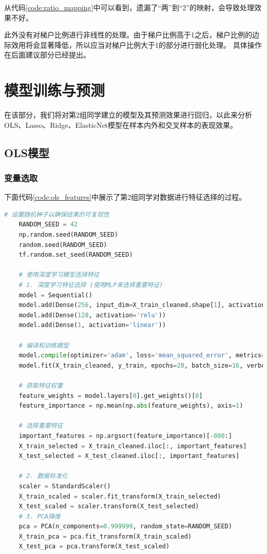 \documentclass[
    report,     %
    oneside,    %
    UTF8,       %
    zihao=-4    %
]{config} %
\begin{document}
从代码\ref{code:ratio_mapping}中可以看到，遗漏了“两”到“2”的映射，会导致处理效果不好。

此外没有对梯户比例进行非线性的处理。由于梯户比例高于1之后，梯户比例的边际效用将会显著降低，所以应当对梯户比例大于1的部分进行弱化处理。
具体操作在后面建议部分已经提出。

\chapter{模型训练与预测}
在该部分，我们将对第2组同学建立的模型及其预测效果进行回归，以此来分析
OLS、Lasso、Ridge、ElasticNet模型在样本内外和交叉样本的表现效果。

\section{OLS模型}

\subsection{变量选取}
下面代码\ref{code:ols_features}中展示了第2组同学对数据进行特征选择的过程。

\begin{lstlisting}[label=code:ols_features, language=Python, caption=OLS模型特征选取]
    # 设置随机种子以确保结果的可复现性
    RANDOM_SEED = 42
    np.random.seed(RANDOM_SEED)
    random.seed(RANDOM_SEED)
    tf.random.set_seed(RANDOM_SEED)

    # 使用深度学习模型选择特征
    # 1. 深度学习特征选择 (使用MLP来选择重要特征)
    model = Sequential()
    model.add(Dense(256, input_dim=X_train_cleaned.shape[1], activation='relu'))
    model.add(Dense(128, activation='relu'))
    model.add(Dense(1, activation='linear'))

    # 编译和训练模型
    model.compile(optimizer='adam', loss='mean_squared_error', metrics=['mean_absolute_error'])
    model.fit(X_train_cleaned, y_train, epochs=20, batch_size=16, verbose=1)

    # 获取特征权重
    feature_weights = model.layers[0].get_weights()[0]
    feature_importance = np.mean(np.abs(feature_weights), axis=1)

    # 选择重要特征
    important_features = np.argsort(feature_importance)[-800:]
    X_train_selected = X_train_cleaned.iloc[:, important_features]
    X_test_selected = X_test_cleaned.iloc[:, important_features]

    # 2. 数据标准化
    scaler = StandardScaler()
    X_train_scaled = scaler.fit_transform(X_train_selected)
    X_test_scaled = scaler.transform(X_test_selected)
    # 3. PCA降维
    pca = PCA(n_components=0.999999, random_state=RANDOM_SEED)
    X_train_pca = pca.fit_transform(X_train_scaled)
    X_test_pca = pca.transform(X_test_scaled)
\end{lstlisting}
\end{document}
